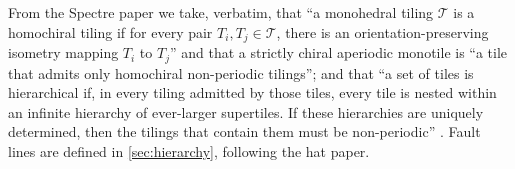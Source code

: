 From the Spectre paper we take, verbatim, that ``a monohedral tiling $\mathcal{T}$ is a
homochiral tiling if for every pair $T_i,T_j\in\mathcal{T}$, there is an orientation-preserving
isometry mapping $T_i$ to $T_j$'' and that a strictly chiral aperiodic monotile is ``a tile that
admits only homochiral non-periodic tilings''; and that ``a set of tiles is hierarchical if, in
every tiling admitted by those tiles, every tile is nested within an infinite hierarchy of
ever-larger supertiles. If these hierarchies are uniquely determined, then the tilings that
contain them must be non-periodic'' \cite{SMKGS24b}. Fault lines are defined in
\cref{sec:hierarchy}, following the hat paper.
